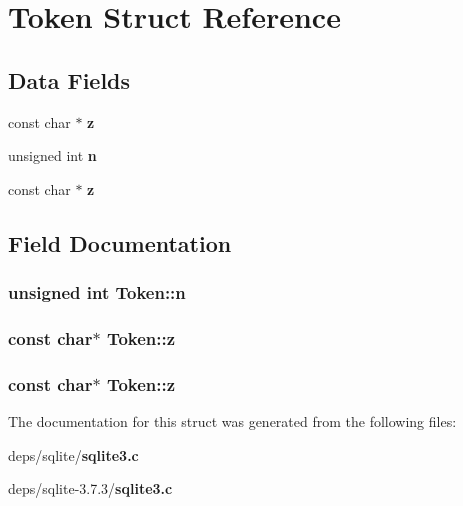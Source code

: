 \section{Token Struct Reference}
\label{structToken}
\subsection*{Data Fields}
\begin{CompactItemize}
\item 
const char $\ast$ \bf{z}
\item 
unsigned int \bf{n}
\item 
const char $\ast$ \bf{z}
\end{CompactItemize}


\subsection{Field Documentation}
\subsubsection{\setlength{\rightskip}{0pt plus 5cm}unsigned int \bf{Token::n}}\label{structToken_2c9d63d2fcb4763b482072e453a6f078}


\subsubsection{\setlength{\rightskip}{0pt plus 5cm}const char$\ast$ \bf{Token::z}}\label{structToken_dbaba6854badba40441ce9d812dc721a}


\subsubsection{\setlength{\rightskip}{0pt plus 5cm}const char$\ast$ \bf{Token::z}}\label{structToken_dbaba6854badba40441ce9d812dc721a}




The documentation for this struct was generated from the following files:\begin{CompactItemize}
\item 
deps/sqlite/\bf{sqlite3.c}\item 
deps/sqlite-3.7.3/\bf{sqlite3.c}\end{CompactItemize}
